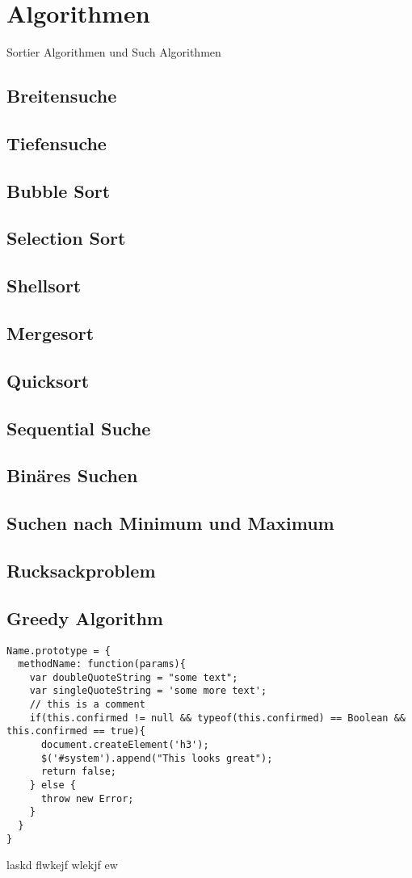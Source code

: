 \documentclass{book}
\begin{document}
\chapter{Algorithmen}
Sortier Algorithmen und Such Algorithmen
\section{Breitensuche}
\section{Tiefensuche}
\section{Bubble Sort}
\section{Selection Sort}
\section{Shellsort}
\section{Mergesort}
\section{Quicksort}
\section{Sequential Suche}
\section{Binäres Suchen}
\section{Suchen nach Minimum und Maximum}
\section{Rucksackproblem}
\section{Greedy Algorithm}

\medskip
\begin{lstlisting}[caption=My Javascript Example]
Name.prototype = {
  methodName: function(params){
    var doubleQuoteString = "some text";
    var singleQuoteString = 'some more text';
    // this is a comment
    if(this.confirmed != null && typeof(this.confirmed) == Boolean && this.confirmed == true){
      document.createElement('h3');
      $('#system').append("This looks great");
      return false;
    } else {
      throw new Error;
    }
  }
}
\end{lstlisting}
laskd flwkejf wlekjf ew
\end{document}
